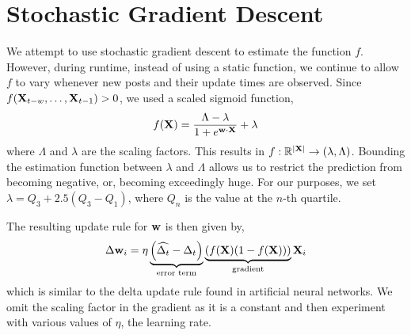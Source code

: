 \section{Stochastic Gradient Descent}

We attempt to use stochastic gradient descent to estimate the function $f$.  
However, during runtime, instead of using a static function, we continue to 
allow $f$ to vary whenever new posts and their update times are observed.
Since $f(\mathbf{X}_{t-w},\hdots,\mathbf{X}_{t-1}) > 0$, we used a scaled sigmoid function,
\[
	f(\mathbf{X}) = \frac{\Lambda-\lambda}{1 + e^{\mathbf{w} \cdot \mathbf{X}}} + \lambda
\]
where $\Lambda$ and $\lambda$ are the scaling factors. This results in $f: 
\mathbb{R}^{|\mathbf{X}|}  \rightarrow (\lambda,\Lambda)$. Bounding the estimation 
function between $\lambda$ and $\Lambda$ allows us to restrict the prediction 
from becoming negative, or, becoming exceedingly huge. For our purposes, we set 
$\lambda = Q_3 + 2.5(Q_{3} - Q_{1})$, where $Q_n$ is the value at the $n$-th 
quartile. 

The resulting update rule for $\mathbf{w}$ is then given by,
\[
	\Delta \mathbf{w}_i = \eta
				\underbrace{\left(\widehat{\Delta_t} - \Delta_t \right)}_{\text{error term}}
				\underbrace{\left( f(\mathbf{X})(1-f(\mathbf{X})) \right)}_{\text{gradient}}
						\mathbf{X}_i
\]
which is similar to the delta update rule found in artificial neural networks.  
We omit the scaling factor in the gradient as it is a constant and then 
experiment with various values of $\eta$, the learning rate. 

